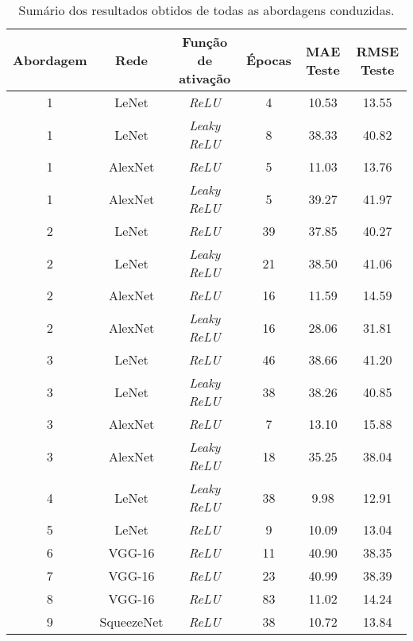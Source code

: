 \begin{table}[!ht]
	\caption{Sumário dos resultados obtidos de todas as abordagens conduzidas.}
	\label{tab:resultsAll}
  \begin{center}
		\begin{tabular}{cccccc}
			\toprule
			Abordagem & Rede & Função de ativação & Épocas & MAE Teste & RMSE Teste \\
			\midrule
			1 & LeNet & \emph{ReLU}  & 4 & 10.53 & 13.55 \\
			1 & LeNet & \emph{Leaky ReLU} & 8 & 38.33 & 40.82 \\
			1 & AlexNet & \emph{ReLU}  & 5 & 11.03 & 13.76 \\
			1 & AlexNet & \emph{Leaky ReLU} & 5 & 39.27 & 41.97 \\
			2 & LeNet & \emph{ReLU}  & 39 & 37.85 & 40.27 \\
			2 & LeNet & \emph{Leaky ReLU} & 21 & 38.50 & 41.06 \\
			2 & AlexNet & \emph{ReLU}  & 16 & 11.59 & 14.59 \\
			2 & AlexNet & \emph{Leaky ReLU} & 16 & 28.06 & 31.81 \\
			3 & LeNet & \emph{ReLU} & 46 &  38.66 & 41.20 \\
			3 & LeNet & \emph{Leaky ReLU} &  38 & 38.26 & 40.85 \\
			3 & AlexNet & \emph{ReLU} & 7 & 13.10 & 15.88 \\
			3 & AlexNet & \emph{Leaky ReLU} & 18 & 35.25 & 38.04 \\
			4 &	LeNet & \emph{Leaky ReLU} & 38 & 9.98 & 12.91 \\
			5 & LeNet & \emph{ReLU} & 9 &  10.09 & 13.04 \\
			6 & VGG-16 & \emph{ReLU} & 11 & 40.90 & 38.35 \\
			7 & VGG-16 & \emph{ReLU} & 23 & 40.99 & 38.39 \\
			8 & VGG-16 & \emph{ReLU} & 83 & 11.02 & 14.24 \\
			9 & SqueezeNet & \emph{ReLU} & 38 & 10.72 & 13.84 \\
			\bottomrule
		\end{tabular}
  \end{center}
\end{table}
